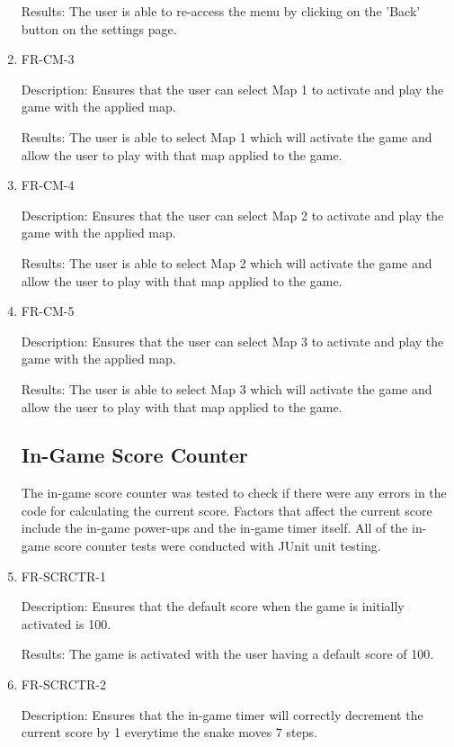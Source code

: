 \documentclass[12pt, titlepage]{article}
\begin{document}
\begin{enumerate}
Results: The user is able to re-access the menu by clicking on the 'Back' button on the settings page.

\item{FR-CM-3}
\label{fr:cm-3}

Description: Ensures that the user can select Map 1 to activate and play the game with the applied map.

Results: The user is able to select Map 1 which will activate the game and allow the user to play with that map applied to the game.

\item{FR-CM-4}
\label{fr:cm-4}

Description: Ensures that the user can select Map 2 to activate and play the game with the applied map.

Results: The user is able to select Map 2 which will activate the game and allow the user to play with that map applied to the game.

\item{FR-CM-5}
\label{fr:cm-5}

Description: Ensures that the user can select Map 3 to activate and play the game with the applied map.

Results: The user is able to select Map 3 which will activate the game and allow the user to play with that map applied to the game.

\subsection{In-Game Score Counter}
The in-game score counter was tested to check if there were any errors in the code for calculating the current score. Factors that affect the current score include the in-game power-ups and the in-game timer itself. All of the in-game score counter tests were conducted with JUnit unit testing.
 
\item{FR-SCRCTR-1}
\label{fr:scrctr-1}

Description: Ensures that the default score when the game is initially activated is 100.

Results: The game is activated with the user having a default score of 100.

\item{FR-SCRCTR-2}
\label{fr:scrctr-2}

Description: Ensures that the in-game timer will correctly decrement the current score by 1 everytime the snake moves 7 steps.


\end{enumerate}
\end{document}
